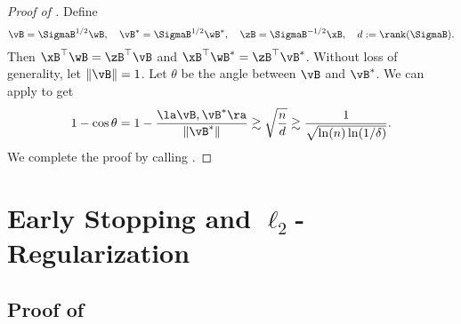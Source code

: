 \documentclass[11pt]{article}
\begin{document}
\begin{proof}[Proof of ]
Define 
\[\vB = \SigmaB^{1/2}\wB,\quad \vB^* = \SigmaB^{1/2}\wB^*,\quad \zB = \SigmaB^{-1/2}\xB,\quad 
d:=\rank(\SigmaB).\]
Then $\xB^\top \wB =  \zB^\top \vB$ and $\xB^\top \wB^* =  \zB^\top \vB^*$.
Without loss of generality, let $\|\vB\|=1$.
Let $\theta$ be the angle between $\vB$ and $\vB^*$.
We can apply  to get 
\begin{align*}
    1- \cos \theta =  1-\frac{\la \vB, \vB^*\ra}{\|\vB^*\|} 
    \gtrsim \sqrt{\frac{n}{d}} \gtrsim \frac{1}{\sqrt{\ln(n)\ln(1/\delta)}}.
\end{align*}
We complete the proof by calling .
\end{proof}













\section{Early Stopping and \texorpdfstring{$\ell_2$}{l2}-Regularization}
\subsection{Proof of \texorpdfstring{}{Theorem 5.1}}\label{sec:proof:path:global-angle}
\end{document}
